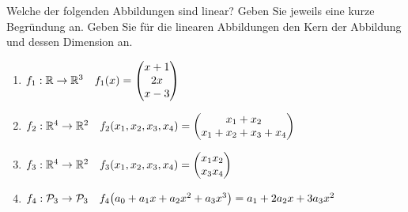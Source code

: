 \documentclass[german,12pt]{homework}
\newcommand{\RR}{\mathbb{R}}
\newcommand{\PP}{\mathcal{P}}
\DeclarePairedDelimiter{\enbrace}{(}{)}
\begin{document}
    \begin{problem}
        Welche der folgenden Abbildungen sind linear? Geben Sie jeweils eine
        kurze Begründung an. Geben Sie für die linearen Abbildungen den Kern der
        Abbildung und dessen Dimension an.
        \begin{enumerate}
            \item \(f_1: \RR \to \RR^3 \quad f_1\enbrace*{x} = \begin{pmatrix}
            x + 1\\2x\\x - 3\end{pmatrix}\)
            \item \(f_2: \RR^4 \to \RR^2 \quad f_2\enbrace*{x_1, x_2, x_3, x_4}
            = \begin{pmatrix}x_1 + x_2\\x_1 + x_2 + x_3 + x_4\end{pmatrix}\)
            \item \(f_3: \RR^4 \to \RR^2 \quad f_3\enbrace*{x_1, x_2, x_3, x_4}
            = \begin{pmatrix}x_1x_2\\x_3x_4\end{pmatrix}\)
            \item \(f_4: \PP_3 \to \PP_3 \quad f_4\enbrace*{a_0 + a_1x + a_2x^2
            + a_3x^3} = a_1 + 2a_2x + 3a_3x^2\)
        \end{enumerate}
    \end{problem}
\end{document}
